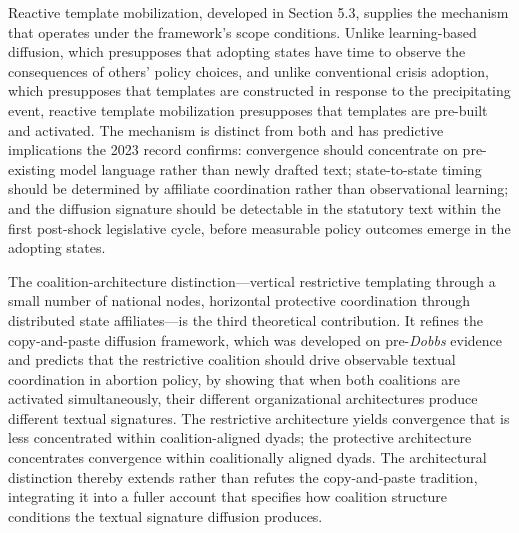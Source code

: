 Reactive template mobilization, developed in Section 5.3, supplies the mechanism that operates under the framework's scope conditions. Unlike learning-based diffusion, which presupposes that adopting states have time to observe the consequences of others' policy choices, and unlike conventional crisis adoption, which presupposes that templates are constructed in response to the precipitating event, reactive template mobilization presupposes that templates are pre-built and activated. The mechanism is distinct from both and has predictive implications the 2023 record confirms: convergence should concentrate on pre-existing model language rather than newly drafted text; state-to-state timing should be determined by affiliate coordination rather than observational learning; and the diffusion signature should be detectable in the statutory text within the first post-shock legislative cycle, before measurable policy outcomes emerge in the adopting states.
 
The coalition-architecture distinction---vertical restrictive templating through a small number of national nodes, horizontal protective coordination through distributed state affiliates---is the third theoretical contribution. It refines the \textcite{jansaCopyPasteLawmaking2019} copy-and-paste diffusion framework, which was developed on pre-\textit{Dobbs} evidence and predicts that the restrictive coalition should drive observable textual coordination in abortion policy, by showing that when both coalitions are activated simultaneously, their different organizational architectures produce different textual signatures. The restrictive architecture yields convergence that is less concentrated within coalition-aligned dyads; the protective architecture concentrates convergence within coalitionally aligned dyads. The architectural distinction thereby extends rather than refutes the copy-and-paste tradition, integrating it into a fuller account that specifies how coalition structure conditions the textual signature diffusion produces.
 
